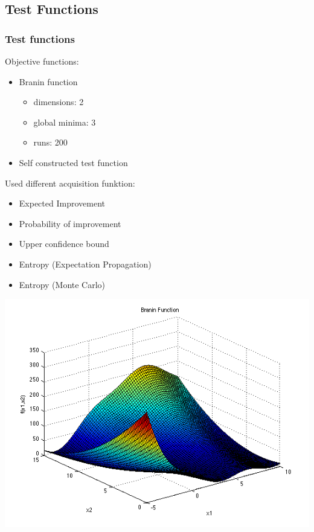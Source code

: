 \documentclass[10pt,handout]{beamer}
\begin{document}




\subsection{Test Functions}
\begin{frame}
\frametitle{Test functions}
\begin{minipage}{0.55\textwidth}
Objective functions:
\begin{itemize}
\item Branin function
\begin{itemize}
\item dimensions: 2
\item global minima: 3
\item runs: 200
\end{itemize}
\item Self constructed test function
\end{itemize}
Used different acquisition funktion:
\begin{itemize}
\item Expected Improvement
\item Probability of improvement
\item Upper confidence bound
\item Entropy (Expectation Propagation)
\item Entropy (Monte Carlo)
\end{itemize}
\end{minipage}
\begin{minipage}[t]{0.43\textwidth}
\includegraphics[width=\textwidth]{branin.png}
\end{minipage}
\end{frame}
\end{document}
